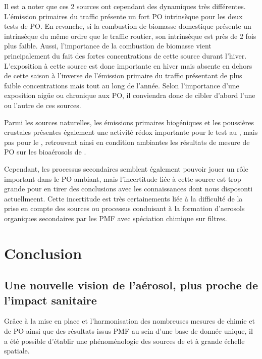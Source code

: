 Il est a noter que ces 2 sources ont cependant des dynamiques très différentes. L'émission
primaires du traffic présente un fort PO intrinsèque pour les deux tests de PO.
En revanche, si la combustion de biomasse domestique présente un \POAA{} intrinsèque du
même ordre que le traffic routier, son \PODTT{} intrinsèque est près de 2 fois plus
faible. Aussi, l'importance de la combustion de biomasse vient principalement du fait des
fortes concentrations de cette source durant l'hiver. L'exposition à cette source est donc
importante en hiver mais absente en dehors de cette saison à l'inverse de l'émission
primaire du traffic présentant de plus faible concentrations mais tout au long de l'année.
Selon l'importance d'une exposition aigüe ou chronique aux PO, il conviendra donc de
cibler d'abord l'une ou l'autre de ces sources.

Parmi les sources naturelles, les émissions primaires biogéniques et les poussières
crustales présentes également une activité rédox importante pour le test au \PODTT, mais
pas pour le \POAA, retrouvant ainsi en condition ambiantes les résultats de mesure de PO
sur les bioaérosols de \cite{samakeUnexpected2017}.

Cependant, les processus secondaires semblent également pouvoir jouer un rôle important
dans le PO ambiant, mais l'incertitude liée à cette source est trop grande pour en tirer
des conclusions avec les connaissances dont nous disposonti actuellmeent. Cette
incertitude est très certainements liée à la difficulté de la prise en compte des sources
ou processus conduisant à la formation d'aerosols organiques secondaires par les PMF avec
spéciation chimique sur filtres.


\section{Conclusion}%
\label{sec:conclusion_chap4}

\subsection{Une nouvelle vision de l'aérosol, plus proche de l'impact sanitaire}%
\label{sub:une_nouvelle_vision_de_l_aérosol_plus_proche_de_l_impact_sanitaire}

Grâce à la mise en place et l'harmonisation des nombreuses mesures de chimie et de PO
ainsi que des résultats issus PMF au sein d'une base de donnée unique, il a été possible
d'établir une phénoménologie des sources de \POAA{} et \PODTT{} à grande échelle spatiale.

